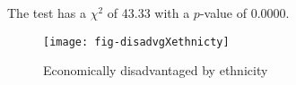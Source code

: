 \documentclass[11pt,letterpaper]{article}
\author{Christopher K. Butler}
\title{}
\begin{document}


The test has a $\chi^2$ of 43.33 with a $p$-value of 0.0000.

\begin{figure}
\caption{Economically disadvantaged by ethnicity}
\label{fig:disadvgXethnicty}
\centering
\texttt{[image: fig-disadvgXethnicty]}
\end{figure}
\end{document}
